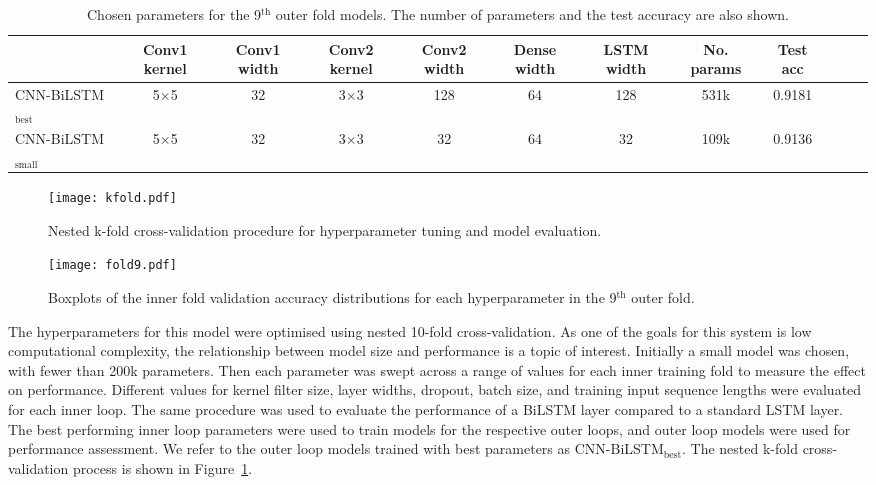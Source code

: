 \documentclass{article}
\begin{document}
\vspace{-2mm}

\begin{table*}[htb]
    \footnotesize
    \centering
    \begin{tabular*}{\textwidth}{@{\extracolsep{\fill}}lccccccccccc}
        \toprule
            &Conv1 kernel &Conv1 width    &Conv2 kernel 
        &Conv2 width &Dense width   &LSTM width &No. params &Test acc\\
        \midrule
        CNN-BiLSTM$_\text{best}$     & 5$\times$5	& 32	& 3$\times$3	& 128	& 64	& 128	& 531k	& 0.9181\\
        CNN-BiLSTM$_\text{small}$    & 5$\times$5	& 32	& 3$\times$3	& 32	& 64	& 32	& 109k	& 0.9136\\
        \bottomrule
    \end{tabular*}
\caption{Chosen parameters for the 9$^{\text{th}}$ outer fold models. The number of parameters and the test accuracy are also shown.}
    \label{tab:fold9}
    \vspace{-1mm}
\end{table*}

\begin{figure}\begin{minipage}[b]{1.0\linewidth}
  \centering
  \centerline{\texttt{[image: kfold.pdf]}}
\end{minipage}
\vspace{-6mm}
\caption{Nested k-fold cross-validation procedure for hyperparameter tuning and model evaluation.}
\label{fig:kfold}
\vspace{-2mm}
\end{figure}

\begin{figure*}[htb]
  \centering
  \texttt{[image: fold9.pdf]}
\vspace{-6mm}
\caption{Boxplots of the inner fold validation accuracy distributions for each hyperparameter in the 9$^{\text{th}}$ outer fold.}
\label{fig:fold9}
\vspace{-3mm}
\end{figure*}

The hyperparameters for this model were optimised using nested 10-fold cross-validation.
As one of the goals for this system is low computational complexity, the relationship between model size and performance is a topic of interest.
Initially a small model was chosen, with fewer than 200k parameters.
Then each parameter was swept across a range of values for each inner training fold to measure the effect on performance.
Different values for kernel filter size, layer widths, dropout, batch size, and training input sequence lengths were evaluated for each inner loop.
The same procedure was used to evaluate the performance of a BiLSTM layer compared to a standard LSTM layer.
The best performing inner loop parameters were used to train models for the respective outer loops, and outer loop models were used for performance assessment.
We refer to the outer loop models trained with best parameters as CNN-BiLSTM$_\text{best}$.
The nested k-fold cross-validation process is shown in \mbox{Figure \ref{fig:kfold}}.
\end{document}
